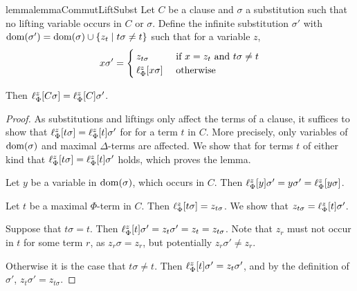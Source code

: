 \begin{restatable}{lemma}{lemmaCommutLiftSubst}
	\label{lemma:lif}
	Let $C$ be a clause and $\sigma$ a substitution such that no lifting variable occurs in $C$ or $\sigma$.
	Define the infinite substitution $\sigma'$ with $\operatorname{dom}(\sigma') = \operatorname{dom}(\sigma) \cup \{ z_t \mid t\sigma \neq t \}$ such that for a variable $z$, 
	\[
		x \sigma' =
		\begin{cases} 
			z_{t\sigma} & \text{ if } x = z_t \text{ and } t\sigma \neq t \\
			\ell_{\Phi}^{z}[x\sigma] & \text{ otherwise}
		\end{cases} 
	\]

	Then
	$\ell_{\Phi}^{z}[C\sigma] =
	\ell_{\Phi}^{z}[C]\sigma'$.
\end{restatable}
\begin{proof}
	As substitutions and liftings only affect the terms of a clause, it suffices to  show that 
	$\ell_{\Phi}^{z}[t\sigma] = \ell_{\Phi}^{z}[t]\sigma'$ for for a term $t$ in $C$.
	More precisely, only variables of $\operatorname{dom}(\sigma)$ and maximal $\Delta$-terms are affected. 
	We show that for terms $t$ of either kind that
	$ \ell_{\Phi}^{z}[ t \sigma ] = \ell_{\Phi}^{z}[ t ] \sigma'$ holds, which proves the lemma.

	Let $y$ be a variable in $\operatorname{dom}(\sigma)$, which occurs in $C$. Then $\ell_{\Phi}^{z}[y]\sigma' = y\sigma' = \ell_{\Phi}^{z}[y\sigma]$.

	Let $t$ be a maximal $\Phi$-term in $C$.
	Then $\ell_{\Phi}^{z}[ t\sigma] = z_{t\sigma}$.
	We show that $z_{t\sigma} = \ell_{\Phi}^{z}[t]\sigma'$.

	Suppose that $t\sigma = t$. Then $\ell_{\Phi}^{z}[t]\sigma' = z_t\sigma' = z_t = z_{t\sigma}$.
	Note that $z_r$ must not occur in $t$ for some term $r$, as $z_r\sigma = z_r$, but potentially $z_r\sigma' \neq z_r$.

	Otherwise it is the case that $t\sigma \neq t$.
	Then $\ell_{\Phi}^{z}[t]\sigma' = z_t\sigma'$, and by the definition of $\sigma'$, $z_t\sigma' = z_{t\sigma}$.
\end{proof}




